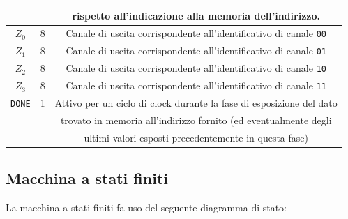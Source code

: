 \documentclass[a4paper,11pt]{article} %
\begin{document}
\begin{tabular}{|c|c|c|}
        &                    & rispetto all'indicazione alla memoria dell'indirizzo.                     \\
        \hline
        $Z_0$                     & 8                  & Canale di uscita corrispondente all'identificativo di canale \texttt{00}  \\
        \hline
        $Z_1$                     & 8                  & Canale di uscita corrispondente all'identificativo di canale \texttt{01}  \\
        \hline
        $Z_2$                     & 8                  & Canale di uscita corrispondente all'identificativo di canale \texttt{10}  \\
        \hline
        $Z_3$                     & 8                  & Canale di uscita corrispondente all'identificativo di canale \texttt{11}  \\
        \hline
        \texttt{DONE}             & 1                  & Attivo per un ciclo di clock durante la fase di esposizione del dato      \\
        &                    & trovato in memoria all'indirizzo fornito (ed eventualmente degli          \\
        &                    & ultimi valori esposti precedentemente in questa fase)                     \\
        \hline
    \end{tabular}

    \newpage

    \subsection{Macchina a stati finiti}\label{subsec:macchina-a-stati-finiti}

    La macchina a stati finiti fa uso del seguente diagramma di stato:

    \medskip

\end{document}
